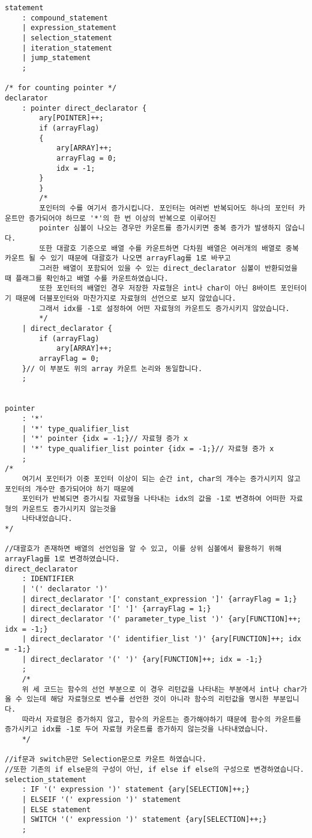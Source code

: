 \documentclass[11pt,oneside,a4paper]{article}
\begin{document}
\begin{verbatim}
statement
	: compound_statement
	| expression_statement
	| selection_statement
	| iteration_statement
	| jump_statement
	;

/* for counting pointer */
declarator
	: pointer direct_declarator {
		ary[POINTER]++;
		if (arrayFlag)
		{
			ary[ARRAY]++;
			arrayFlag = 0;
			idx = -1;
		}
		}
		/*
		포인터의 수를 여기서 증가시킵니다. 포인터는 여러번 반복되어도 하나의 포인터 카운트만 증가되어야 하므로 '*'의 한 번 이상의 반복으로 이루어진
		pointer 심볼이 나오는 경우만 카운트를 증가시키면 중복 증가가 발생하지 않습니다.
		또한 대괄호 기준으로 배열 수를 카운트하면 다차원 배열은 여러개의 배열로 중복 카운트 될 수 있기 때문에 대괄호가 나오면 arrayFlag를 1로 바꾸고
		그러한 배열이 포함되어 있을 수 있는 direct_declarator 심볼이 반환되었을 때 플래그를 확인하고 배열 수를 카운트하였습니다.
		또한 포인터의 배열인 경우 저장한 자료형은 int나 char이 아닌 8바이트 포인터이기 때문에 더블포인터와 마찬가지로 자료형의 선언으로 보지 않았습니다.
		그래서 idx를 -1로 설정하여 어떤 자료형의 카운트도 증가시키지 않았습니다. 
		*/
	| direct_declarator {
		if (arrayFlag)
			ary[ARRAY]++;
		arrayFlag = 0;
	}// 이 부분도 위의 array 카운트 논리와 동일합니다.
	;


pointer
	: '*'
	| '*' type_qualifier_list
	| '*' pointer {idx = -1;}// 자료형 증가 x
	| '*' type_qualifier_list pointer {idx = -1;}// 자료형 증가 x
	;
/*
	여기서 포인터가 이중 포인터 이상이 되는 순간 int, char의 개수는 증가시키지 않고 포인터의 개수만 증가되어야 하기 때문에
	포인터가 반복되면 증가시킬 자료형을 나타내는 idx의 값을 -1로 변경하여 어떠한 자료형의 카운트도 증가시키지 않는것을
	나타내었습니다.
*/

//대괄호가 존재하면 배열의 선언임을 알 수 있고, 이를 상위 심볼에서 활용하기 위해 arrayFlag를 1로 변경하였습니다.
direct_declarator
	: IDENTIFIER
	| '(' declarator ')'
	| direct_declarator '[' constant_expression ']' {arrayFlag = 1;} 
	| direct_declarator '[' ']' {arrayFlag = 1;}
	| direct_declarator '(' parameter_type_list ')' {ary[FUNCTION]++; idx = -1;} 
	| direct_declarator '(' identifier_list ')' {ary[FUNCTION]++; idx = -1;}
	| direct_declarator '(' ')' {ary[FUNCTION]++; idx = -1;}
	;
	/*
	위 세 코드는 함수의 선언 부분으로 이 경우 리턴값을 나타내는 부분에서 int나 char가 올 수 있는데 해당 자료형으로 변수를 선언한 것이 아니라 함수의 리턴값을 명시한 부분입니다.
	따라서 자료형은 증가하지 않고, 함수의 카운트는 증가해야하기 때문에 함수의 카운트를 증가시키고 idx를 -1로 두어 자료형 카운트를 증가하지 않는것을 나타내였습니다.
	*/

//if문과 switch문만 Selection문으로 카운트 하였습니다.
//또한 기존의 if else문의 구성이 아닌, if else if else의 구성으로 변경하였습니다.
selection_statement
	: IF '(' expression ')' statement {ary[SELECTION]++;}
	| ELSEIF '(' expression ')' statement
	| ELSE statement
	| SWITCH '(' expression ')' statement {ary[SELECTION]++;}
	;


\end{verbatim}
\end{document}
